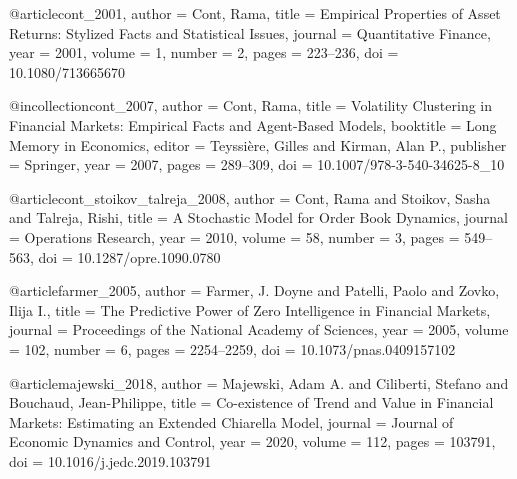 @article{cont_2001,
  author  = {Cont, Rama},
  title   = {Empirical Properties of Asset Returns: Stylized Facts and Statistical Issues},
  journal = {Quantitative Finance},
  year    = {2001}, volume = {1}, number = {2}, pages = {223--236},
  doi     = {10.1080/713665670}
}


@incollection{cont_2007,
  author    = {Cont, Rama},
  title     = {Volatility Clustering in Financial Markets: Empirical Facts and Agent-Based Models},
  booktitle = {Long Memory in Economics}, editor = {Teyssi{\`e}re, Gilles and Kirman, Alan P.},
  publisher = {Springer}, year = {2007}, pages = {289--309},
  doi     = {10.1007/978-3-540-34625-8_10}
}


@article{cont_stoikov_talreja_2008,
  author  = {Cont, Rama and Stoikov, Sasha and Talreja, Rishi},
  title   = {A Stochastic Model for Order Book Dynamics},
  journal = {Operations Research},
  year    = {2010}, volume = {58}, number = {3}, pages = {549--563},
  doi     = {10.1287/opre.1090.0780}
}


@article{farmer_2005,
  author  = {Farmer, J. Doyne and Patelli, Paolo and Zovko, Ilija I.},
  title   = {The Predictive Power of Zero Intelligence in Financial Markets},
  journal = {Proceedings of the National Academy of Sciences},
  year    = {2005}, volume = {102}, number = {6}, pages = {2254--2259},
  doi     = {10.1073/pnas.0409157102}
}


@article{majewski_2018,
  author  = {Majewski, Adam A. and Ciliberti, Stefano and Bouchaud, Jean-Philippe},
  title   = {Co-existence of Trend and Value in Financial Markets: Estimating an Extended Chiarella Model},
  journal = {Journal of Economic Dynamics and Control},
  year    = {2020}, volume = {112}, pages = {103791},
  doi     = {10.1016/j.jedc.2019.103791}
}


